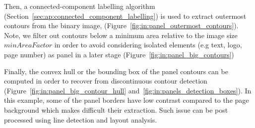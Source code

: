 Then, a connected-component labelling algorithm (Section~\ref{sec:ap:connected_component_labelling}) is used to extract outermost contours from the binary image, (Figure~\ref{fig:in:panel_outermost_contours}).
Note, we filter out contours below a minimum area relative to the image size $minAreaFactor$ in order to avoid considering isolated elements (e.g text, logo, page number) as panel in a later stage (Figure~\ref{fig:in:panel_big_contours})

Finally, the convex hull or the bounding box of the panel contours can be computed in order to recover from discontinuous contour detection (Figure~\ref{fig:in:panel_big_contour_hull} and~\ref{fig:in:panels_detection_boxes}).
In this example, some of the panel borders have low contrast compared to the page background which makes difficult their extraction.
Such issue can be post processed using line detection and layout analysis.





